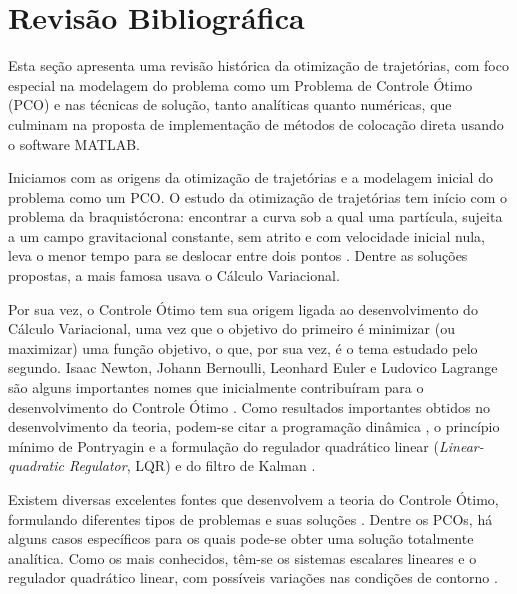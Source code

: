 \section{Revisão Bibliográfica}
\label{sec:rev-bibliografica}

Esta seção apresenta uma revisão histórica da otimização de trajetórias, com foco especial na modelagem do problema como um Problema de Controle Ótimo (PCO) e nas técnicas de solução, tanto analíticas quanto numéricas, que culminam na proposta de implementação de métodos de colocação direta usando o software MATLAB.


Iniciamos com as origens da otimização de trajetórias e a modelagem inicial do problema como um PCO. O estudo da otimização de trajetórias tem início com o problema da braquistócrona: encontrar a curva sob a qual uma partícula, sujeita a um campo gravitacional constante, sem atrito e com velocidade inicial nula, leva o menor tempo para se deslocar entre dois pontos \cite{sussmann_300_1997}. Dentre as soluções propostas, a mais famosa usava o Cálculo Variacional.

Por sua vez, o Controle Ótimo tem sua origem ligada ao desenvolvimento do Cálculo Variacional, uma vez que o objetivo do primeiro é minimizar (ou maximizar) uma função objetivo, o que, por sua vez, é o tema estudado pelo segundo. Isaac Newton, Johann Bernoulli, Leonhard Euler e Ludovico Lagrange são alguns importantes nomes que inicialmente contribuíram para o desenvolvimento do Controle Ótimo \cite{becerra_optimal_2008}. Como resultados importantes obtidos no desenvolvimento da teoria, podem-se citar a programação dinâmica \cite{bellman_dynamic_2010}, o princípio mínimo de Pontryagin \cite{pontryagin_mathematical_1987} e a formulação do regulador quadrático linear (\textit{Linear-quadratic Regulator}, LQR) e do filtro de Kalman \cite{kalman_contributions_1960, kalman_new_1960}.


Existem diversas excelentes fontes que desenvolvem a teoria do Controle Ótimo, formulando diferentes tipos de problemas e suas soluções \cite{betts_practical_2010, kirk_optimal_2004, bryson_applied_2018, athans_optimal_2007}. Dentre os PCOs, há alguns casos específicos para os quais pode-se obter uma solução totalmente analítica. Como os mais conhecidos, têm-se os sistemas escalares lineares e o regulador quadrático linear, com possíveis variações nas condições de contorno \cite{lewis_optimal_2012}.


